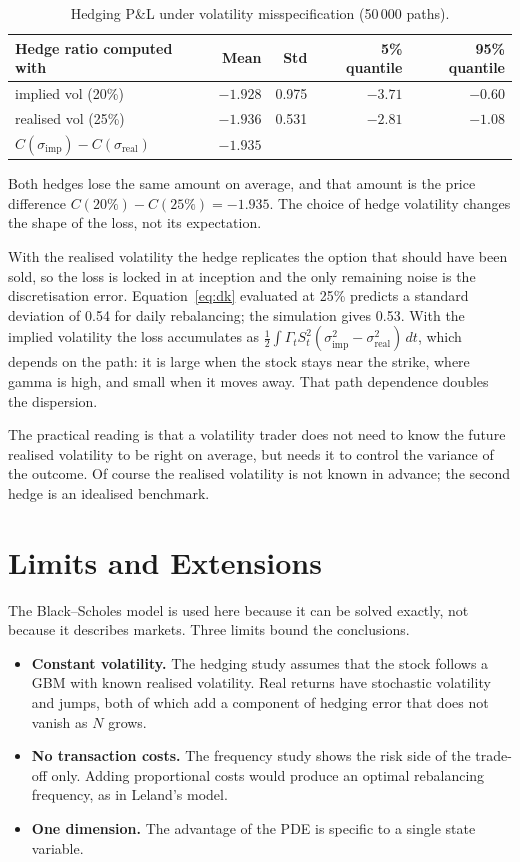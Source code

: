 \documentclass[11pt,a4paper,oneside]{report}
\begin{document}
\begin{table}[H]\centering\small
\begin{tabular}{lrrrr}
\toprule
Hedge ratio computed with & Mean & Std & 5\% quantile & 95\% quantile\\
\midrule
implied vol (20\%) & $-1.928$ & 0.975 & $-3.71$ & $-0.60$\\
realised vol (25\%) & $-1.936$ & 0.531 & $-2.81$ & $-1.08$\\
\midrule
$C(\sigma_{\text{imp}})-C(\sigma_{\text{real}})$ & $-1.935$ &&&\\
\bottomrule
\end{tabular}
\caption{Hedging P\&L under volatility misspecification (50\,000 paths).}
\end{table}

Both hedges lose the same amount on average, and that amount is the price difference $C(20\%)-C(25\%)=-1.935$. The choice of hedge volatility changes the shape of the loss, not its expectation.

With the realised volatility the hedge replicates the option that should have been sold, so the loss is locked in at inception and the only remaining noise is the discretisation error. Equation~\eqref{eq:dk} evaluated at 25\% predicts a standard deviation of 0.54 for daily rebalancing; the simulation gives 0.53. With the implied volatility the loss accumulates as $\tfrac12\int\Gamma_t S_t^2(\sigma_{\text{imp}}^2-\sigma_{\text{real}}^2)\,dt$, which depends on the path: it is large when the stock stays near the strike, where gamma is high, and small when it moves away. That path dependence doubles the dispersion.

The practical reading is that a volatility trader does not need to know the future realised volatility to be right on average, but needs it to control the variance of the outcome. Of course the realised volatility is not known in advance; the second hedge is an idealised benchmark.

\chapter{Limits and Extensions}

The Black--Scholes model is used here because it can be solved exactly, not because it describes markets. Three limits bound the conclusions.

\begin{itemize}[leftmargin=1.5em]
\item \textbf{Constant volatility.} The hedging study assumes that the stock follows a GBM with known realised volatility. Real returns have stochastic volatility and jumps, both of which add a component of hedging error that does not vanish as $N$ grows.
\item \textbf{No transaction costs.} The frequency study shows the risk side of the trade-off only. Adding proportional costs would produce an optimal rebalancing frequency, as in Leland's model.
\item \textbf{One dimension.} The advantage of the PDE is specific to a single state variable.
\end{itemize}
\end{document}
